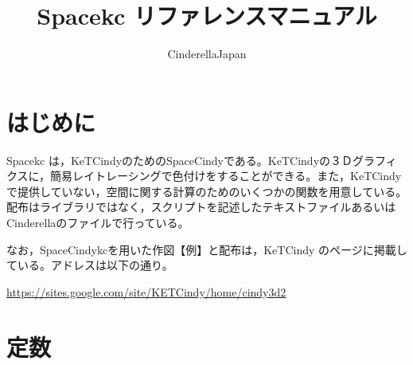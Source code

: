 \documentclass[papersize,a4paper,12pt,uplatex]{jsarticle}
\begin{document}
\title{Spacekc リファレンスマニュアル}
\author{CinderellaJapan}
\maketitle

\tableofcontents

\newpage

\section{はじめに}
Spacekc は，KeTCindyのためのSpaceCindyである。KeTCindyの３Ｄグラフィクスに，簡易レイトレーシングで色付けをすることができる。また，KeTCindyで提供していない，空間に関する計算のためのいくつかの関数を用意している。配布はライブラリではなく，スクリプトを記述したテキストファイルあるいはCinderellaのファイルで行っている。

なお，SpaceCindykcを用いた作図【例】と配布は，KeTCindy のページに掲載している。アドレスは以下の通り。

\hspace{10mm} \url{https://sites.google.com/site/KETCindy/home/cindy3d2}

\section{定数}
\end{document}
